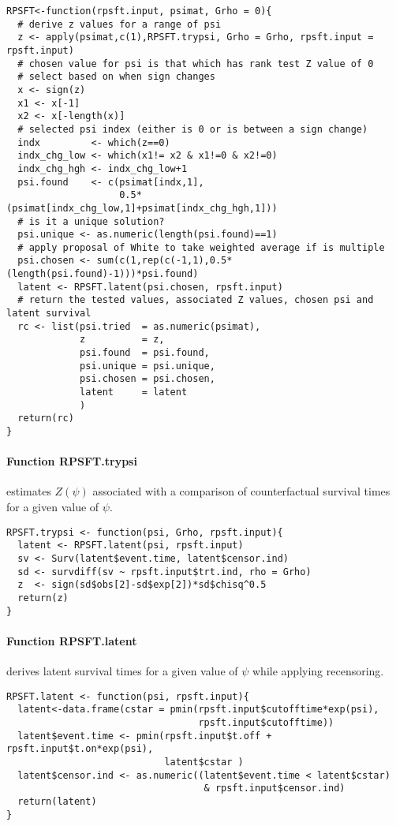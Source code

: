 \begin{Verbatim}[fontsize=\small, baselinestretch=0.75]
RPSFT<-function(rpsft.input, psimat, Grho = 0){   
  # derive z values for a range of psi
  z <- apply(psimat,c(1),RPSFT.trypsi, Grho = Grho, rpsft.input = rpsft.input)  
  # chosen value for psi is that which has rank test Z value of 0
  # select based on when sign changes
  x <- sign(z)
  x1 <- x[-1]
  x2 <- x[-length(x)]  
  # selected psi index (either is 0 or is between a sign change)
  indx         <- which(z==0)
  indx_chg_low <- which(x1!= x2 & x1!=0 & x2!=0)
  indx_chg_hgh <- indx_chg_low+1
  psi.found    <- c(psimat[indx,1], 
                    0.5*(psimat[indx_chg_low,1]+psimat[indx_chg_hgh,1])) 
  # is it a unique solution?
  psi.unique <- as.numeric(length(psi.found)==1)  
  # apply proposal of White to take weighted average if is multiple
  psi.chosen <- sum(c(1,rep(c(-1,1),0.5*(length(psi.found)-1)))*psi.found)  
  latent <- RPSFT.latent(psi.chosen, rpsft.input)  
  # return the tested values, associated Z values, chosen psi and latent survival
  rc <- list(psi.tried  = as.numeric(psimat),
             z          = z,
             psi.found  = psi.found,
             psi.unique = psi.unique,
             psi.chosen = psi.chosen,
             latent     = latent
             )
  return(rc)
}
\end{Verbatim}

\paragraph{Function RPSFT.trypsi} estimates $Z(\psi)$ associated with a comparison of counterfactual survival times for a given value of $\psi$.
\begin{Verbatim}[fontsize=\small, baselinestretch=0.75]
RPSFT.trypsi <- function(psi, Grho, rpsft.input){ 
  latent <- RPSFT.latent(psi, rpsft.input)
  sv <- Surv(latent$event.time, latent$censor.ind)
  sd <- survdiff(sv ~ rpsft.input$trt.ind, rho = Grho)
  z  <- sign(sd$obs[2]-sd$exp[2])*sd$chisq^0.5
  return(z)
}
\end{Verbatim}
\paragraph{Function RPSFT.latent} derives latent survival times for a given value of $\psi$ while applying recensoring.
\begin{Verbatim}[fontsize=\small, baselinestretch=0.75]
RPSFT.latent <- function(psi, rpsft.input){
  latent<-data.frame(cstar = pmin(rpsft.input$cutofftime*exp(psi), 
                                  rpsft.input$cutofftime))
  latent$event.time <- pmin(rpsft.input$t.off + rpsft.input$t.on*exp(psi), 
                            latent$cstar )    
  latent$censor.ind <- as.numeric((latent$event.time < latent$cstar) 
                                   & rpsft.input$censor.ind)
  return(latent)
}
\end{Verbatim}
\clearpage\newpage
